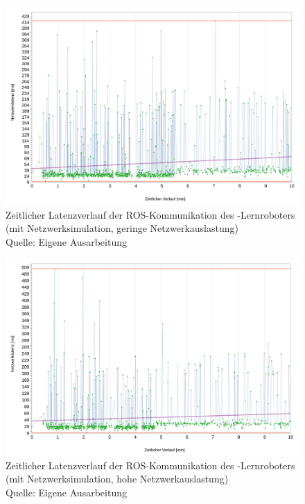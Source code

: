 \begin{figure}[htb]
	\centering
	\includegraphics[width=1.04\textwidth]{images/ergebnisse/ROS_App_und_mit_Netzwerksimulation}
	\caption[Zeitlicher Latenzverlauf der ROS-Kommunikation des -Lernroboters (mit Netzwerksimulation, geringe Netzwerkauslastung)]{Zeitlicher Latenzverlauf der ROS-Kommunikation des -Lernroboters (mit Netzwerksimulation, geringe Netzwerkauslastung)\\Quelle: Eigene Ausarbeitung}
	\label{fig:measurement_robot_ros_with_network_simulation_low_network_traffic}
\end{figure}
\FloatBarrier

\begin{figure}[htb]
	\centering
	\includegraphics[width=1.04\textwidth]{images/ergebnisse/ROS_App_mit_Netzwerksimulation_und_hohe_Auslastung}
	\caption[Zeitlicher Latenzverlauf der ROS-Kommunikation des -Lernroboters (mit Netzwerksimulation, hohe Netzwerkauslastung)]{Zeitlicher Latenzverlauf der ROS-Kommunikation des -Lernroboters (mit Netzwerksimulation, hohe Netzwerkauslastung)\\Quelle: Eigene Ausarbeitung}
	\label{fig:measurement_robot_ros_with_network_simulation_high_network_traffic}
\end{figure}
\FloatBarrier

